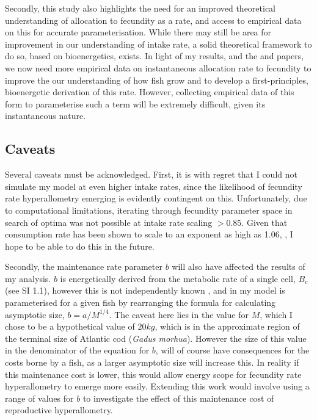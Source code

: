 \documentclass[a4paper]{article} %
\begin{document}
\begin{center}
\begin{minipage}{\linewidth}
Secondly, this study also highlights the need for an improved theoretical understanding of allocation to fecundity as a rate, and access to empirical data on this for accurate parameterisation. While there may still be area for improvement in our understanding of intake rate, a solid theoretical framework to do so, based on bioenergetics, exists. In light of my results, and the \textcite{Barneche2018-reproductive_output} and \textcite{Marshall2019b} papers, we now need more empirical data on instantaneous allocation rate to fecundity to improve the our understanding of how fish grow and to develop a first-principles, bioenergetic derivation of this rate. However, collecting empirical data of this form to parameterise such a term will be extremely difficult, given its instantaneous nature.

\subsection{Caveats}
Several caveats must be acknowledged. First, it is with regret that I could not simulate my model at even higher intake rates, since the likelihood of fecundity rate hyperallometry emerging is evidently contingent on this. Unfortunately, due to computational limitations, iterating through fecundity parameter space in search of optima was not possible at intake rate scaling $> 0.85$. Given that consumption rate has been shown to scale to an exponent as high as 1.06, \autocite{Pawar2012}, I hope to be able to do this in the future.

Secondly, the maintenance rate parameter $b$ will also have affected the results of my analysis. $b$ is energetically derived from the metabolic rate of a single cell, $B_c$ (see SI 1.1), however this is not independently known \autocite{West2001}, and in my model is parameterised for a given fish by rearranging the formula for calculating asymptotic size, $b = a/M^{1/4}$. The caveat here lies in the value for $M$, which I chose to be a hypothetical value of $20kg$, which is in the approximate region of the terminal size of Atlantic cod (\textit{Gadus morhua}). However the size of this value in the denominator of the equation for $b$, will of course have consequences for the costs borne by a fish, as a larger asymptotic size will increase this. In reality if this maintenance cost is lower, this would allow energy scope for fecundity rate hyperallometry to emerge more easily. Extending this work would involve using a range of values for $b$ to investigate the effect of this maintenance cost of reproductive hyperallometry.


\end{minipage}
\end{center}
\end{document}
